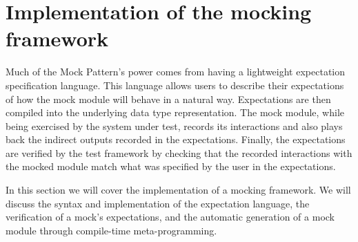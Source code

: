 


\section{Implementation of the mocking framework}
\label{application:implementation}


Much of the Mock Pattern's power comes from having a lightweight
expectation specification language. This language allows users to
describe their expectations of how the mock module will behave in a
natural way. Expectations are then compiled into the underlying data
type representation. The mock module, while being exercised by the
system under test, records its interactions and also plays back the
indirect outputs recorded in the expectations. Finally, the
expectations are verified by the test framework by checking that the
recorded interactions with the mocked module match what was specified
by the user in the expectations.

In this section we will cover the implementation of a mocking
framework. We will discuss the syntax and implementation of the
expectation language, the verification of a mock's expectations, and
the automatic generation of a mock module through compile-time
meta-programming.

